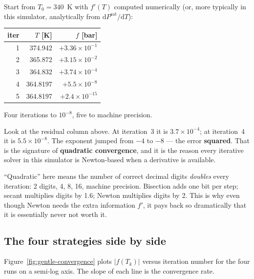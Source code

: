 \documentclass[11pt,a4paper]{article}
\begin{document}
\begin{example}
Start from $T_0 = 340$~K with $f'(T)$ computed numerically (or, more
typically in this simulator, analytically from $\mathrm{d}P^{\mathrm{sat}}/\mathrm{d}T$):
\begin{center}\small
\begin{tabular}{rrr}
\toprule
iter & $T$ [K] & $f$ [bar]\\
\midrule
1 & 374.942 & $+3.36\times 10^{-1}$\\
2 & 365.872 & $+3.15\times 10^{-2}$\\
3 & 364.832 & $+3.74\times 10^{-4}$\\
4 & 364.8197 & $+5.5\times 10^{-8}$\\
5 & 364.8197 & $+2.4\times 10^{-15}$\\
\bottomrule
\end{tabular}
\end{center}
Four iterations to $10^{-8}$, five to machine precision.
\end{example}

Look at the residual column above.  At iteration~3 it is
$3.7\times 10^{-4}$; at iteration~4 it is $5.5\times 10^{-8}$.  The
exponent jumped from $-4$ to $-8$ --- the error \textbf{squared}.
That is the signature of \textbf{quadratic convergence}, and it is
the reason every iterative solver in this simulator is Newton-based
when a derivative is available.

\begin{intuition}
``Quadratic'' here means the number of correct decimal digits
\emph{doubles} every iteration: 2 digits, 4, 8, 16, machine
precision.  Bisection adds one bit per step; secant multiplies digits
by 1.6; Newton multiplies digits by 2.  This is why even though
Newton needs the extra information $f'$, it pays back so dramatically
that it is essentially never not worth it.
\end{intuition}

\subsection{The four strategies side by side}

Figure~\ref{fig:gentle-convergence} plots $|f(T_k)|$ versus iteration
number for the four runs on a semi-log axis.  The slope of each line
is the convergence rate.
\end{document}
